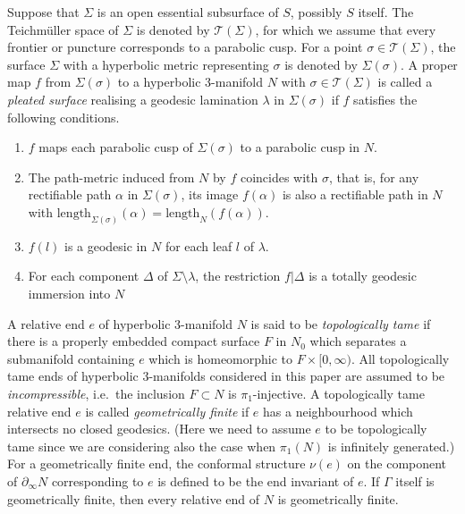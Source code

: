 \documentclass{amsart}
\theoremstyle{definition}
\numberwithin{figure}{section}
\numberwithin{equation}{section}
\newcommand{\teich}{\mathcal{T}}
\newcommand{\ie}{i.e.\ }
\def\part{\partial}
\def\fd{\pi_1}
\def\G{\Gamma}
\def\G{\Gamma}
\begin{document}
Suppose that $\Sigma$ is  an open  essential subsurface of $S$, possibly $S$ itself.
The Teichm\"{u}ller space of $\Sigma$ is denoted by $\teich(\Sigma)$, for which we assume that every frontier or puncture corresponds to a parabolic cusp.
For a point $\sigma \in \teich(\Sigma)$, the surface $\Sigma$ with a hyperbolic metric representing $\sigma$ is denoted by $\Sigma(\sigma)$.
A proper map $f$ from $\Sigma(\sigma)$ to a hyperbolic 3-manifold $N$ with $\sigma\in \teich(\Sigma)$ is called a 
\emph{pleated surface} realising a geodesic lamination $\lambda$ in $\Sigma(\sigma)$ if $f$ satisfies the following conditions.
\begin{enumerate}[\rm (i)]
\item $f$ maps each parabolic cusp of $\Sigma(\sigma)$ to a parabolic cusp in $N$.
\item The path-metric induced from $N$ by $f$ coincides with $\sigma$, that is, for any rectifiable path $\alpha$ in $\Sigma(\sigma)$, its image $f(\alpha)$ is also a rectifiable path in $N$ with $\mathrm{length}_{\Sigma(\sigma)}(\alpha)=\mathrm{length}_N(f(\alpha))$.
\item $f(l)$ is a geodesic in $N$ for each leaf $l$ of $\lambda$.
\item For each component $\Delta$ of $\Sigma\setminus \lambda$, the restriction $f|\Delta$ is a totally geodesic immersion into $N$
\end{enumerate}


A relative end $e$ of  hyperbolic 3-manifold $N$ is said to be  \emph{topologically tame} if  there is a properly embedded compact surface $F$ in $N_0$ which separates a submanifold containing $e$ which is  homeomorphic to $F\times [0,\infty)$.
All topologically tame ends of hyperbolic 3-manifolds considered in this paper are assumed to be \emph{incompressible}, 
\ie  the inclusion $F\subset N$ is $\fd$-injective.
A topologically tame relative end $e$ is called \emph{geometrically finite} if $e$ has a neighbourhood which intersects no closed geodesics.
(Here we need to assume $e$ to be topologically tame since we are considering also the case when $\pi_1(N)$ is infinitely generated.)
For a geometrically finite end, the conformal structure $\nu(e)$ on the component of $\part_\infty N$ corresponding to $e$ is defined to be the end invariant of $e$.
If $\G$ itself is geometrically finite, then every relative end of $N$ is geometrically finite.
\end{document}
